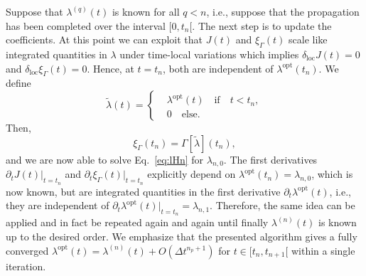 \documentclass[twocolumn,prb,showpacs,aps,superscriptaddress]{revtex4}
\newcommand{\deltaloc}[0]{\ensuremath{\delta_\mathrm{loc}}}
\begin{document}
Suppose that $\lambda^{(q)}(t)$ is known for all $q < n$, i.e., suppose that
the propagation has been completed over the interval $[0, t_n[$.  The next step
is to update the coefficients.  At this point we can exploit that $J(t)$ and
$\xi_\Gamma(t)$ scale like integrated quantities in $\lambda$ under time-local
variations which implies $\deltaloc J(t) = 0$ and $\deltaloc \xi_\Gamma(t) =
0$. Hence, at $t=t_n$, both are independent of $\lambda^\text{opt}(t_n)$. We
define
\begin{equation}
  \tilde \lambda(t)
  =
  \left\{
    \begin{aligned}
      &\lambda^\text{opt}(t)\quad \text{if} \quad t < t_n,\\
      &0 \quad \text{else}.
    \end{aligned}
  \right.
\end{equation}
Then, 
\begin{equation}
  \xi_\Gamma(t_n) = \Gamma[\tilde \lambda](t_n),
\end{equation}
and we are now able to solve Eq.\ \eqref{eq:lHn} for $\lambda_{n,0}$. 
The first derivatives $\partial_t J(t)\bigr|_{t=t_n}$ and $\partial_t
\xi_\Gamma(t)\bigr|_{t=t_n}$ explicitly depend on $\lambda^\text{opt}(t_n) =
\lambda_{n,0}$, which is now known, but are integrated quantities in the first
derivative $\partial_t \lambda^\text{opt}(t)$, i.e., they are independent of
$\partial_t \lambda^\text{opt}(t)\bigr|_{t=t_n} = \lambda_{n,1}$.  Therefore,
the same idea can be applied and in fact be repeated again and again until
finally $\lambda^{(n)}(t)$ is known up to the desired order.  We emphasize that
the presented algorithm gives a fully converged $\lambda^\text{opt}(t) =
\lambda^{(n)}(t) + O(\Delta t^{n_p + 1})$ for $t \in [t_n, t_{n+1}[$ within a
single iteration.

%
%
\end{document}
